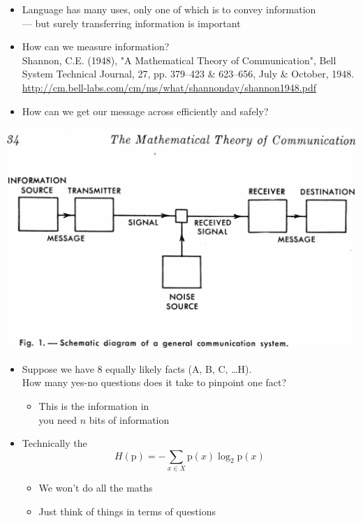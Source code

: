 \documentclass[headrule,footrule]{foils}
\begin{document}
\begin{itemize}
\item Language has many uses, only one of which is to convey information
  \\ --- but surely transferring information is important
\item How can we measure information?
  \\ {\small Shannon, C.E. (1948), "A Mathematical Theory of Communication", Bell System Technical Journal, 27, pp. 379–423 \& 623–656, July \& October, 1948. \url{http://cm.bell-labs.com/cm/ms/what/shannonday/shannon1948.pdf}}
\item How can we get our message across efficiently and safely?
\end{itemize}


\begin{center}
  \includegraphics[height=0.9\textheight]{pics/shannon_comm_channel}
\end{center}


\begin{itemize}
\item Suppose we have 8 equally likely facts (A, B, C, \ldots H). 
 \\ How many yes-no  questions does it take to pinpoint one fact?\task

  \begin{itemize}
  \item This is the information in 
\\ you need $n$ bits of information
  \end{itemize}
  \item Technically the  \[ H(\mathrm{p}) = -\sum_{x \in X} \mathrm{p}(x)\log_2\mathrm{p}(x) \]
    \begin{itemize}
    \item We won't do all the maths
    \item Just think of things in terms of questions
    \end{itemize}
  \end{itemize}
\end{document}
